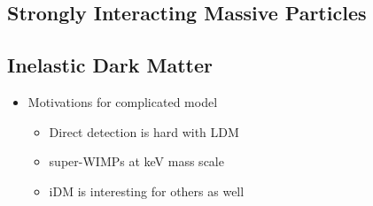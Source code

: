 \subsection{Strongly Interacting Massive Particles}
\label{sec:theory-simps}

\subsection{Inelastic Dark Matter}
\label{sec:theory-idm}

\begin{itemize}
  \item Motivations for complicated model
        \begin{itemize}
          \item Direct detection is hard with LDM \cite{ldmconstraints-2019}
          \item super-WIMPs at keV mass scale \cite{superwimps-2008}
          \item iDM is interesting for others as well \cite{darkseaquest-2018}
        \end{itemize}
\end{itemize}

